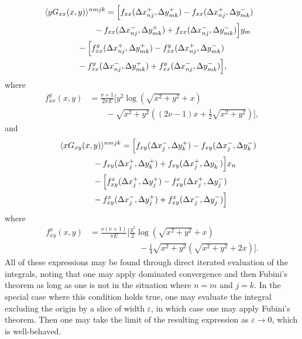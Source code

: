 \documentclass[aps,prl,reprint,twocolumn,groupedaddress,showpacs]{revtex4-1}
\begin{document}
\begin{align}
\lefteqn{\langle yG_{xx}(x,y) \rangle^{nmjk} = \Big[f_{xx}( \Delta x_{nj}^+,\Delta y_{mk}^+) - f_{xx}( \Delta x_{nj}^+,\Delta y_{mk}^-) } \nonumber\\
&\qquad\qquad\qquad-f_{xx}(\Delta x_{nj}^-, \Delta y_{mk}^+) + f_{xx}(\Delta x_{nj}^- , \Delta y_{mk}^-)  \Big] y_m\nonumber\\
&\qquad\qquad - \Big[ f^y_{xx}(\Delta x_{nj}^+,\Delta y_{mk}^+) - f^y_{xx}(\Delta x_{nj}^+,\Delta y_{mk}^-)\nonumber\\
&\qquad\qquad - f^y_{xx}(\Delta x_{nj}^-,\Delta y_{mk}^+) + f^y_{xx}(\Delta x_{nj}^-,\Delta y_{mk}^-)  \Big],
\end{align}
where
\begin{align}
f^y_{xx}(x,y) &=\frac{\nu+1}{2\pi E} \Bigg[y^2\log\left(\sqrt{x^2+y^2}+x \right)  \nonumber\\
&\qquad- \sqrt{x^2+y^2}\left((2\nu-1)x + \frac{1}{2}\sqrt{x^2+y^2} \right)  \Bigg],
\end{align}
and
\begin{align}
\lefteqn{\langle xG_{xy}(x,y) \rangle^{nmjk} = \Big[ f_{xy}(\Delta x_j^-, \Delta y_k^+) - f_{xy}(\Delta x_j^-,\Delta y_k^-) } \nonumber\\
&\qquad\qquad- f_{xy}(\Delta x_j^+,\Delta y_k^+) + f_{xy} (\Delta x_j^+,\Delta y_k^-) \Big]x_n\nonumber\\
&\qquad\qquad -   \Big[ f_{xy}^x(\Delta x_j^+,\Delta y_j^+) - f_{xy}^x(\Delta x_j^+,\Delta y_j^-) \nonumber\\
&\qquad\qquad- f_{xy}^x(\Delta x_j^-,\Delta y_j^+) + f_{xy}^x(\Delta x_j^-,\Delta y_j^-)\Big]
\end{align}
where
\begin{align}
f_{xy}^x(x,y) &=\frac{\nu(\nu+1)}{\pi E}\Big[ \frac{y^2}{2}\log\left(\sqrt{x^2+y^2} +x \right) \nonumber\\
&\qquad\qquad\qquad-\frac{1}{4}\sqrt{x^2+y^2}\left(\sqrt{x^2+y^2}+2x\right) \Big].
\end{align}
All of these expressions may be found through direct iterated evaluation of the integrals, noting that
one may apply dominated convergence and then Fubini's theorem as long as one is not in the situation where $n=m$ and $j=k$. In the 
special case where this condition holds true, one may evaluate the integral excluding the origin by a slice
of width $\varepsilon$, in which case one may apply Fubini's theorem. Then one may take the limit of 
the resulting expression as $\varepsilon\to0$, which is well-behaved.

\end{document}

